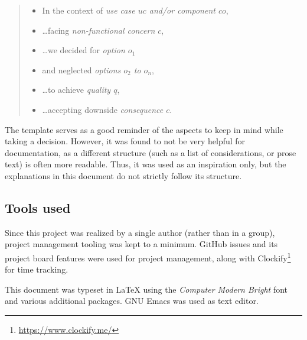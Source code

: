 \begin{quote}
  \begin{itemize}[parsep=5pt]
    \item In the context of \emph{use case $uc$ and/or component $co$},
    \item \ldots facing \emph{non-functional concern $c$},
    \item \ldots we decided for \emph{option $o_1$}
    \item and neglected \emph{options $o_2$ to $o_n$},
    \item \ldots to achieve \emph{quality $q$},
    \item \ldots accepting downside \emph{consequence $c$}.
  \end{itemize}
\end{quote}

The template serves as a good reminder of the aspects to keep in mind
while taking a decision. However, it was found to not be very helpful for
documentation, as a different structure (such as a list of considerations, or
prose text) is often more readable. Thus, it was used as an inspiration only,
but the explanations in this document do not strictly follow its structure.


\subsection{Tools used}
Since this project was realized by a single author (rather than in a group),
project management tooling was kept to a minimum. GitHub issues and its project
board features were used for project management, along with
Clockify\footnote{\url{https://www.clockify.me/}} for time tracking.

This document was typeset in \LaTeX{} using the \emph{Computer Modern Bright}
font and various additional packages. GNU Emacs was used as text editor.